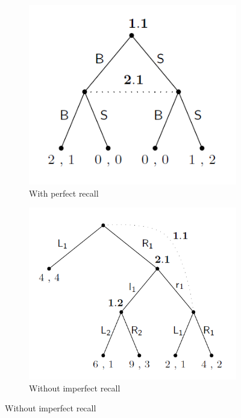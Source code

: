 \begin{figure}[H]
\begin{subfigure}[t]{0.45\textwidth}
 \includegraphics[width=\textwidth]{images/img_1_1_03.png}
 \caption{With perfect recall}
\end{subfigure}
\begin{subfigure}[t]{0.45\textwidth}
 \includegraphics[width=\textwidth]{images/img_1_1_04.png}
 \caption{Without imperfect recall}
\end{subfigure}
\end{figure}
